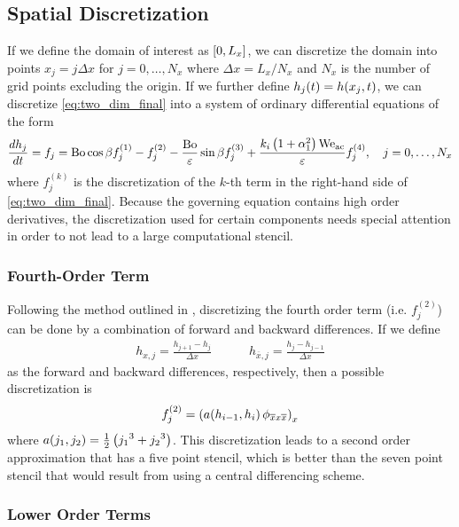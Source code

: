 \subsection{Spatial Discretization}
If we define the domain of interest as $\left[ 0, L_x \right]$, we can discretize the 
domain into points $x_j = j\Delta x$ for $j = 0, \ldots, N_x$ where 
$\Delta x = L_x / N_x$ and $N_x$ is the number of grid points excluding the origin. 
If we further define $h_j\!\left( t \right) = h\!\left( x_j, t \right)$, we can discretize 
\cref{eq:two_dim_final} into a system of ordinary differential equations of the form 
\begin{equation}
    \frac{d h_j}{d t} = f_j = \mathrm{Bo}\cos \beta f_j^{(1)} - f_j^{(2)} -  \frac{\mathrm{Bo}}{\varepsilon} \sin \beta f_j^{(3)} +  
    \frac{k_i \left( 1 + \alpha_1^2 \right) \mathrm{We_{ac}}}{\varepsilon} f_j^{(4)}, \quad j = 0, \ldots, N_x
    \label{eq:ode_sys}
\end{equation}
where $f_j^{(k)}$ is the discretization of the $k$-th term in
the right-hand side of \cref{eq:two_dim_final}. Because the governing equation 
contains high order derivatives, the discretization used for certain components 
needs special attention in order to not lead to a large computational stencil.

\subsubsection{Fourth-Order Term}
Following the method outlined in \cite{kondic2003instabilities}, discretizing the fourth order term (i.e.\! $f_j^{(2)}$) can be done by a combination
of forward and backward differences. If we define 
\begin{align*}
    h_{x, j} = \frac{h_{j+1} - h_j}{\Delta x} \quad \quad \quad h_{\overline{x}, j} = \frac{h_{j} - h_{j-1}}{\Delta x}
\end{align*}
as the forward and backward differences, respectively, then a possible discretization is 
\begin{equation}
    f_j^{\left( 2 \right)} = \left( a\!\left( h_{i-1}, h_i \right) \phi_{\overline{x}x\overline{x}} \right)_{x}
    \label{eq:f2_disc}
\end{equation}
where $a\!\left( j_1, j_2 \right) = \frac{1}{2} \left( {j_1}^3 + {j_2}^3 \right)$. This discretization leads to a 
second order approximation that has a five point stencil, which is better than the seven point stencil
that would result from using a central differencing scheme. 

\subsubsection{Lower Order Terms}
